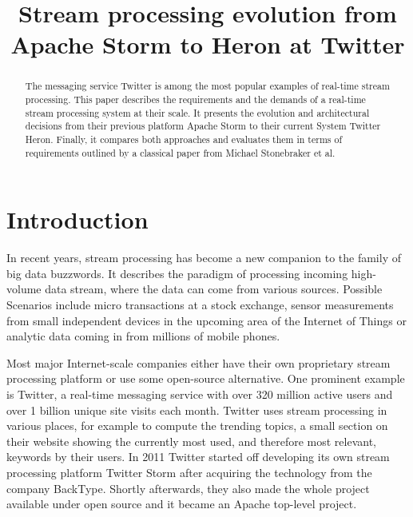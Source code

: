 \documentclass[conference]{IEEEtran}
\begin{document}
\title{Stream processing evolution from\\Apache Storm to Heron at Twitter}

\author{
}

\maketitle

\begin{abstract}

The messaging service Twitter is among the most popular examples of real-time stream processing.
This paper describes the requirements and the demands of a real-time stream processing system at their scale.
It presents the evolution and architectural decisions from their previous platform Apache Storm to their current System Twitter Heron.
Finally, it compares both approaches and evaluates them in terms of requirements outlined by a classical paper from Michael Stonebraker et al.

\end{abstract}

\section{Introduction}
\label{sec:Introduction}

In recent years, stream processing has become a new companion to the family of big data buzzwords.
It describes the paradigm of processing incoming high-volume data stream, where the data can come from various sources.
Possible Scenarios include micro transactions at a stock exchange, sensor measurements from small independent devices in the upcoming area of the Internet of Things or analytic data coming in from millions of mobile phones.

Most major Internet-scale companies either have their own proprietary stream processing platform or use some open-source alternative.
One prominent example is Twitter, a real-time messaging service with over 320 million active users and over 1 billion unique site visits each month.
Twitter uses stream processing in various places, for example to compute the trending topics, a small section on their website showing the currently most used, and therefore most relevant, keywords by their users.
In 2011 Twitter started off developing its own stream processing platform Twitter Storm after acquiring the technology from the company BackType.
Shortly afterwards, they also made the whole project available under open source and it became an Apache top-level project.
\end{document}

